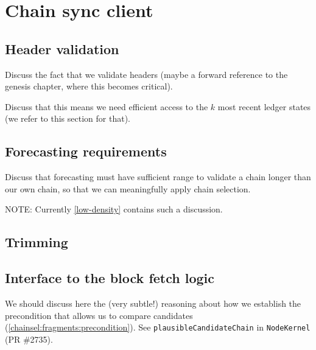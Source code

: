 \chapter{Chain sync client}
\label{chainsyncclient}

\section{Header validation}
\label{chainsyncclient:validation}

Discuss the fact that we validate headers (maybe a forward reference to the genesis chapter, where this becomes critical).

Discuss that this means we need efficient access to the $k$ most recent ledger states (we refer to this section for that).

\section{Forecasting requirements}
\label{chainsyncclient:forecasting}

Discuss that forecasting must have sufficient range to validate a chain longer than our own chain, so that we can meaningfully apply chain selection.

NOTE: Currently \cref{low-density} contains such a discussion.

\section{Trimming}
\label{chainsyncclient:trimming}

\section{Interface to the block fetch logic}
\label{chainsyncclient:plausiblecandidates}

We should discuss here the (very subtle!) reasoning about how we establish
the precondition that allows us to compare candidates
(\cref{chainsel:fragments:precondition}). See
\lstinline!plausibleCandidateChain! in \lstinline!NodeKernel!
(PR \#2735).
